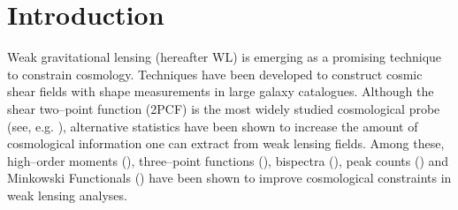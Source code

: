 \documentclass[reprint,aps,prd,superscriptaddress,showkeys,showpacs]{revtex4-1}
\begin{document}

\maketitle



\section{Introduction}
%

Weak gravitational lensing (hereafter WL) is emerging as a promising
technique to constrain cosmology. Techniques have been developed to
construct cosmic shear fields with shape measurements in large galaxy
catalogues. Although the shear two--point function (2PCF) is the most
widely studied cosmological probe (see, e.g. \citep{CFHTKilbinger}),
alternative statistics have been shown to increase the amount of
cosmological information one can extract from weak lensing
fields. Among these, high--order moments
(\citep{moments1,moments2,moments3,moments4,moments5,moments6}),
three--point functions (\citep{3pcf1,3pcf2}), bispectra
(\citep{bispectrum1,bispectrum2,bispectrum3,bispectrum4}), peak counts
(\citep{peaks1,peaks2,peaks3,peaks4,peaks5,peaks6}) and Minkowski
Functionals (\citep{MinkJan,Petri2013}) have been shown to improve
cosmological constraints in weak lensing analyses.
\end{document}
